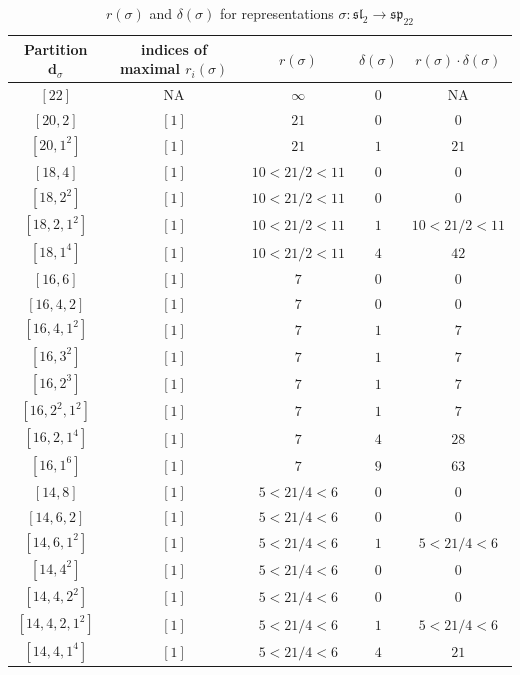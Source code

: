 \documentclass{article}%
\begin{document}
    \begin{center}
    \label{table:sp_22}
    \begin{longtable}{||c|c|c|c|c||}
    \caption{$r(\sigma)$ and $\delta(\sigma)$ for representations $\sigma: \mathfrak{sl}_2 \to \mathfrak{sp}_{22}$}
    \hline
    Partition $\textbf{d}_\sigma$
    &indices of maximal $r_i(\sigma)$
    &$r(\sigma)$
    &$\delta(\sigma)$
    &$r(\sigma) \cdot \delta(\sigma)$
    \\ [0.3ex] \hline\endhead
    $[22]$ & NA & $\infty$ & $0$ & NA \\ \hline 
$[20, 2]$ & $[1]$ & $21$ & $0$ & $0$ \\ \hline 
$[20, 1^{2}]$ & $[1]$ & $21$ & $1$ & $21$ \\ \hline 
$[18, 4]$ & $[1]$ & $10 < 21/2 < 11$ & $0$ & $0$ \\ \hline 
$[18, 2^{2}]$ & $[1]$ & $10 < 21/2 < 11$ & $0$ & $0$ \\ \hline 
$[18, 2, 1^{2}]$ & $[1]$ & $10 < 21/2 < 11$ & $1$ & $10 < 21/2 < 11$ \\ \hline 
$[18, 1^{4}]$ & $[1]$ & $10 < 21/2 < 11$ & $4$ & $42$ \\ \hline 
$[16, 6]$ & $[1]$ & $7$ & $0$ & $0$ \\ \hline 
$[16, 4, 2]$ & $[1]$ & $7$ & $0$ & $0$ \\ \hline 
$[16, 4, 1^{2}]$ & $[1]$ & $7$ & $1$ & $7$ \\ \hline 
$[16, 3^{2}]$ & $[1]$ & $7$ & $1$ & $7$ \\ \hline 
$[16, 2^{3}]$ & $[1]$ & $7$ & $1$ & $7$ \\ \hline 
$[16, 2^{2}, 1^{2}]$ & $[1]$ & $7$ & $1$ & $7$ \\ \hline 
$[16, 2, 1^{4}]$ & $[1]$ & $7$ & $4$ & $28$ \\ \hline 
$[16, 1^{6}]$ & $[1]$ & $7$ & $9$ & $63$ \\ \hline 
$[14, 8]$ & $[1]$ & $5 < 21/4 < 6$ & $0$ & $0$ \\ \hline 
$[14, 6, 2]$ & $[1]$ & $5 < 21/4 < 6$ & $0$ & $0$ \\ \hline 
$[14, 6, 1^{2}]$ & $[1]$ & $5 < 21/4 < 6$ & $1$ & $5 < 21/4 < 6$ \\ \hline 
$[14, 4^{2}]$ & $[1]$ & $5 < 21/4 < 6$ & $0$ & $0$ \\ \hline 
$[14, 4, 2^{2}]$ & $[1]$ & $5 < 21/4 < 6$ & $0$ & $0$ \\ \hline 
$[14, 4, 2, 1^{2}]$ & $[1]$ & $5 < 21/4 < 6$ & $1$ & $5 < 21/4 < 6$ \\ \hline 
$[14, 4, 1^{4}]$ & $[1]$ & $5 < 21/4 < 6$ & $4$ & $21$ \\ \hline 

\end{longtable}
\end{center}
\end{document}
